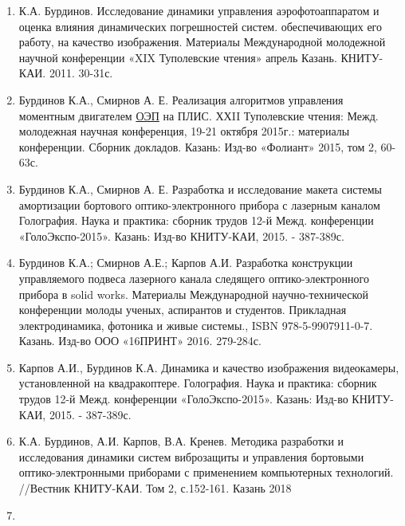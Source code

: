 \begin{enumerate}
  \item К.А. Бурдинов. Исследование динамики управления аэрофотоаппаратом и оценка влияния динамических погрешностей систем. обеспечивающих его работу, на качество изображения. Материалы Международной молодежной научной конференции «XIX Туполевские чтения» апрель Казань. КНИТУ- КАИ. 2011. 30-31с.
  \item Бурдинов К.А., Смирнов А. Е. Реализация алгоритмов управления моментным двигателем  \hyperref[acroEOS]{ОЭП} на ПЛИС. ХХII Туполевские чтения: Межд. молодежная научная конференция, 19-21 октября 2015г.: материалы конференции. Сборник докладов. Казань: Изд-во «Фолиант» 2015, том 2, 60-63с.
  \item Бурдинов К.А., Смирнов А. Е. Разработка и исследование макета системы амортизации бортового оптико-электронного прибора с лазерным каналом Голография. Наука и практика: сборник трудов 12-й Межд. конференции «ГолоЭкспо-2015». Казань: Изд-во КНИТУ-КАИ, 2015. - 387-389с.
  \item Бурдинов К.А.; Смирнов А.Е.; Карпов А.И. Разработка конструкции управляемого подвеса лазерного канала следящего оптико-электронного прибора в solid works. Материалы Международной научно-технической конференции молоды ученых, аспирантов и студентов. Прикладная электродинамика, фотоника и живые системы., ISBN 978-5-9907911-0-7. Казань. Изд-во ООО «16ПРИНТ» 2016. 279-284с.
  \item Карпов А.И., Бурдинов К.А. Динамика и качество изображения видеокамеры, установленной на квадракоптере. Голография. Наука и практика: сборник трудов 12-й Межд. конференции «ГолоЭкспо-2015». Казань: Изд-во КНИТУ-КАИ, 2015. - 387-389с.
  \item К.А. Бурдинов, А.И. Карпов, В.А. Кренев. Методика разработки и исследования динамики систем виброзащиты и управления бортовыми оптико-электронными приборами с применением компьютерных технологий. //Вестник КНИТУ-КАИ. Том 2, с.152-161. Казань 2018
  \item 
\end{enumerate}
